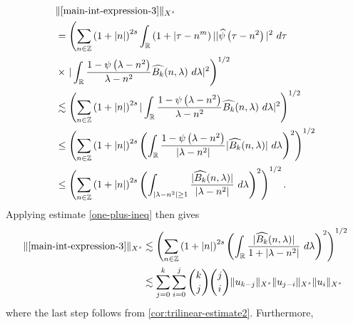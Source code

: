 \documentclass[12pt,reqno]{amsart}
\numberwithin{equation}{section}  %
\numberwithin{figure}{section}
\newcommand{\rr}{\mathbb{R}}
\newcommand{\zz}{\mathbb{Z}}
\newcommand{\wh}{\widehat}
\theoremstyle{plain}
\theoremstyle{definition}
\theoremstyle{remark}
\begin{document}
\begin{equation*}
  \begin{split}
    & \| \eqref{main-int-expression-3} \|_{X^s} 
    \\
    & = \left( \sum_{n \in \zz} \left (1 + |n| \right )^{2s} \int_\rr \left( 1 + | \tau - n^{m
    } \right ) | | \wh{\psi}\left( \tau - n^{2} \right) |^2 \ d \tau
    \right.
    \\
    & \times \left . |
    \int_\rr \frac{1 - \psi\left( \lambda - n^{2} \right)}{\lambda -
    n^{2}} \wh{{B_k}}(n, \lambda) \ d \lambda |^2  \right)^{1/2}
    \\
    & \lesssim \left( \sum_{n \in \zz} \left (1 + |n| \right )^{2s} | \int_\rr
    \frac{1 - \psi\left( \lambda - n^{2} \right)}{\lambda - n^{2}}
    \wh{{B_k}}(n, \lambda) \ d\lambda |^2 \right)^{1/2}
    \\
    & \le \left( \sum_{n \in \zz} \left (1 + |n| \right )^{2s}  \left ( \int_\rr
    \frac{1 - \psi\left( \lambda - n^{2} \right)}{|\lambda - n^{2}|}
    |\wh{{B_k}}(n, \lambda) | \ d\lambda \right )^2 \right)^{1/2}
    \\
    & \le \left( \sum_{n \in \zz} \left (1 + |n| \right )^{2s}  \left ( \int_{| \lambda - 
    n^{2} | \ge 1}
    \frac{|\wh{{B_k}}(n, \lambda) | }{|\lambda - n^{2}|}
    \ d\lambda \right )^2 \right)^{1/2}.
  \end{split}
\end{equation*}
%
%
Applying estimate \eqref{one-plus-ineq} then gives
%
\begin{equation}
  \label{main-int3-est-X-s-part}
  \begin{split}
    \| \eqref{main-int-expression-3} \|_{X^s}
    & \lesssim \left( \sum_{n \in \zz} \left (1 + |n| \right )^{2s}  \left ( \int_\rr
    \frac{|\wh{{B_k}}(n, \lambda)| }{1 + |\lambda - n^{2}|}
     \ d\lambda \right )^2 \right)^{1/2}
     \\
    & \lesssim \sum_{j=0}^{k} \sum_{i=0}^{j} {k \choose j}{j \choose i}
    \|u_{k-j}\|_{X^s} \| u_{j-i}\|_{X^s}
    \| u_i \|_{X^s}
  \end{split}
\end{equation}
%
where the last step follows from \cref{cor:trilinear-estimate2}.
Furthermore, 
%
%
\end{document}
